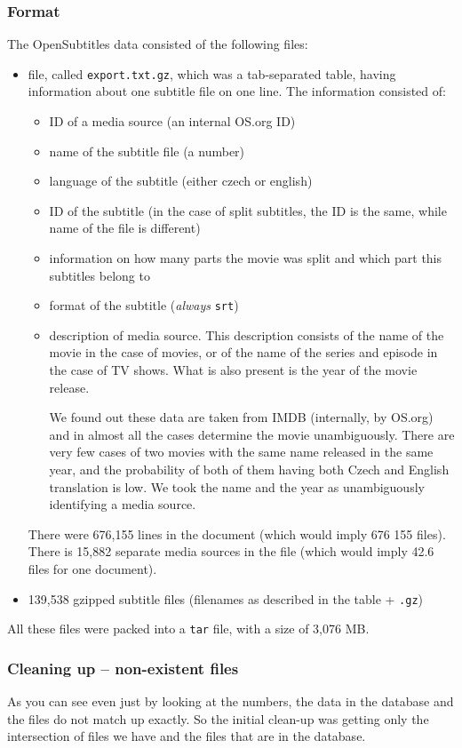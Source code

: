 \subsubsection*{Format}
The OpenSubtitles data consisted of the following files:
\begin{itemize}
    \item file, called \texttt{export.txt.gz}, which was a tab-separated table, having information about one subtitle file on one line. The information consisted of:
    \begin{itemize}
        \item ID of a media source (an internal OS.org ID)
        \item name of the subtitle file (a number)
        \item language of the subtitle (either czech or english)
        \item ID of the subtitle (in the case of split subtitles, the ID is the same, while name of the file is different)
        \item information on how many parts the movie was split and which part this subtitles belong to
        \item format of the subtitle (\emph{always} \texttt{srt})
        \item description of media source. This description consists of the name of the movie in the case of movies, or of the name of the series and episode in the case of TV shows. What is also present is the year of the movie release.
        
         We found out these data are taken from IMDB (internally, by OS.org) and in almost all the cases determine the movie unambiguously. There are very few cases of two movies with the same name released in the same year, and the probability of both of them having both Czech and English translation is low. We took the name and the year as unambiguously identifying a media source.
    \end{itemize}
    
    There were 676,155 lines in the document (which would imply 676 155 files). There is 15,882 separate media sources in the file (which would imply 42.6 files for one document).
    \item 139,538 gzipped subtitle files (filenames as described in the table + \texttt{.gz})
\end{itemize}
All these files were packed into a \texttt{tar} file, with a size of 3,076 MB.

\subsubsection*{Cleaning up -- non-existent files}
As you can see even just by looking at the numbers, the data in the database and the files do not match up exactly. So the initial clean-up was getting only the intersection of files we have and the files that are in the database. 

